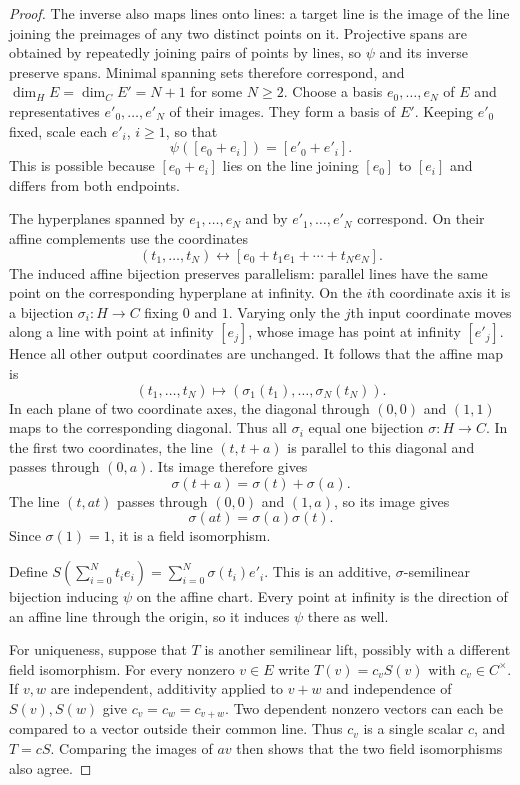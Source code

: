 \begin{proof}
The inverse also maps lines onto lines: a target line is the image of
the line joining the preimages of any two distinct points on it.
Projective spans are obtained by repeatedly joining pairs of points
by lines, so $\psi$ and its inverse preserve spans. Minimal spanning
sets therefore correspond, and $\dim_H E=\dim_C E'=N+1$ for some
$N\ge2$. Choose a basis $e_0,\ldots,e_N$ of $E$ and representatives
$e'_0,\ldots,e'_N$ of their images. They form a basis of $E'$.
Keeping $e'_0$ fixed, scale each $e'_i$, $i\ge1$, so that
\[
 \psi([e_0+e_i])=[e'_0+e'_i].
\]
This is possible because $[e_0+e_i]$ lies on the line joining
$[e_0]$ to $[e_i]$ and differs from both endpoints.

The hyperplanes spanned by $e_1,\ldots,e_N$ and by
$e'_1,\ldots,e'_N$ correspond. On their affine complements use the
coordinates
\[
 (t_1,\ldots,t_N)\longleftrightarrow
 [e_0+t_1e_1+\cdots+t_Ne_N].
\]
The induced affine bijection preserves parallelism: parallel lines
have the same point on the corresponding hyperplane at infinity.
On the $i$th coordinate axis it is a bijection
$\sigma_i:H\to C$ fixing $0$ and $1$. Varying only the $j$th input
coordinate moves along a line with point at infinity $[e_j]$, whose
image has point at infinity $[e'_j]$. Hence all other output coordinates
are unchanged. It follows that the affine map is
\[
 (t_1,\ldots,t_N)\longmapsto
 (\sigma_1(t_1),\ldots,\sigma_N(t_N)).
\]
In each plane of two coordinate axes, the diagonal through $(0,0)$
and $(1,1)$ maps to the corresponding diagonal. Thus all $\sigma_i$ equal one bijection
$\sigma:H\to C$. In the first two coordinates, the line
$(t,t+a)$ is parallel to this diagonal and passes through $(0,a)$.
Its image therefore gives
\[
 \sigma(t+a)=\sigma(t)+\sigma(a).
\]
The line $(t,at)$ passes through $(0,0)$ and $(1,a)$, so its image gives
\[
 \sigma(at)=\sigma(a)\sigma(t).
\]
Since $\sigma(1)=1$, it is a field isomorphism.

Define
$S(\sum_{i=0}^N t_i e_i)=\sum_{i=0}^N\sigma(t_i)e'_i$.
This is an additive, $\sigma$-semilinear bijection inducing $\psi$ on
the affine chart. Every point at infinity is the direction of an
affine line through the origin, so it induces $\psi$ there as well.

For uniqueness, suppose that $T$ is another semilinear lift, possibly
with a different field isomorphism. For every nonzero $v\in E$ write
$T(v)=c_vS(v)$ with $c_v\in C^\times$. If $v,w$ are independent,
additivity applied to $v+w$ and independence of $S(v),S(w)$ give
$c_v=c_w=c_{v+w}$. Two dependent nonzero vectors can each be compared
to a vector outside their common line. Thus $c_v$ is a single scalar
$c$, and $T=cS$. Comparing the images of $av$ then shows that the two
field isomorphisms also agree.
\end{proof}

